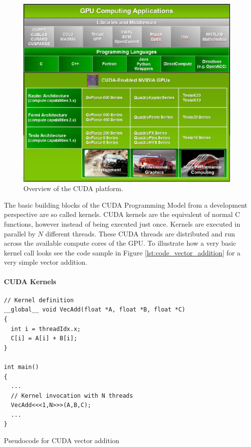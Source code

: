\documentclass[a4paper,11pt]{kth-mag}
\begin{document}
\begin{figure}
  \centering
  \includegraphics[width=\textwidth]{img/cuda_overview.pdf}
  \caption{Overview of the CUDA platform.}
  \label{fig:cuda_overview}
\end{figure}

The basic building blocks of the CUDA Programming Model from a development perspective are so called kernels. CUDA kernels are the equivalent of normal C functions, however instead of being executed just once. Kernels are executed in parallel by $N$ different threads. These CUDA threads are distributed and run across the available compute cores of the GPU. To illustrate how a very basic kernel call looks see the code sample in Figure \ref{lst:code_vector_addition} for a very simple vector addition.

\paragraph{CUDA Kernels}

\begin{listing}
  \centering
  \begin{verbatim}
// Kernel definition
__global__ void VecAdd(float *A, float *B, float *C)
{
  int i = threadIdx.x;
  C[i] = A[i] + B[i];
}

int main()
{
  ...
  // Kernel invocation with N threads
  VecAdd<<<1,N>>>(A,B,C);
  ...
}
  \end{verbatim}
  \caption{Pseudocode for CUDA vector addition}
  \label{lst:code_vector_addition}
\end{listing}
\end{document}
